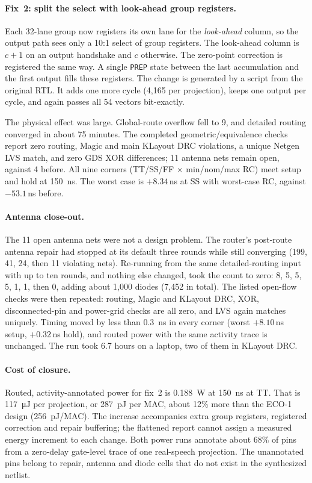 \paragraph{Fix~2: split the select with look-ahead group registers.}
Each 32-lane group now registers its own lane for the \emph{look-ahead} column, so the output path sees only a 10:1 select of group registers. The look-ahead column is $c{+}1$ on an output handshake and $c$ otherwise. The zero-point correction is registered the same way. A single \texttt{PREP} state between the last accumulation and the first output fills these registers. The change is generated by a script from the original RTL. It adds one more cycle (4,165 per projection), keeps one output per cycle, and again passes all 54 vectors bit-exactly.

The physical effect was large. Global-route overflow fell to 9, and detailed routing converged in about 75 minutes. The completed geometric/equivalence checks report zero routing, Magic and main KLayout DRC violations, a unique Netgen LVS match, and zero GDS XOR differences; 11 antenna nets remain open, against 4 before. All nine corners (TT/SS/FF $\times$ min/nom/max RC) meet setup and hold at \SI{150}{ns}. The worst case is $+8.34$\,ns at SS with worst-case RC, against $-53.1$\,ns before.

\paragraph{Antenna close-out.}
The 11 open antenna nets were not a design problem. The router's post-route antenna repair had stopped at its default three rounds while still converging (199, 41, 24, then 11 violating nets). Re-running from the same detailed-routing input with up to ten rounds, and nothing else changed, took the count to zero: 8, 5, 5, 5, 1, 1, then 0, adding about 1,000 diodes (7,452 in total). The listed open-flow checks were then repeated: routing, Magic and KLayout DRC, XOR, disconnected-pin and power-grid checks are all zero, and LVS again matches uniquely. Timing moved by less than \SI{0.3}{ns} in every corner (worst $+8.10$\,ns setup, $+0.32$\,ns hold), and routed power with the same activity trace is unchanged. The run took 6.7 hours on a laptop, two of them in KLayout DRC.


\paragraph{Cost of closure.}
Routed, activity-annotated power for fix~2 is \SI{0.188}{W} at \SI{150}{ns} at TT. That is \SI{117}{\micro\joule} per projection, or \SI{287}{pJ} per MAC, about 12\% more than the ECO-1 design (\SI{256}{pJ}/MAC). The increase accompanies extra group registers, registered correction and repair buffering; the flattened report cannot assign a measured energy increment to each change. Both power runs annotate about 68\% of pins from a zero-delay gate-level trace of one real-speech projection. The unannotated pins belong to repair, antenna and diode cells that do not exist in the synthesized netlist.

